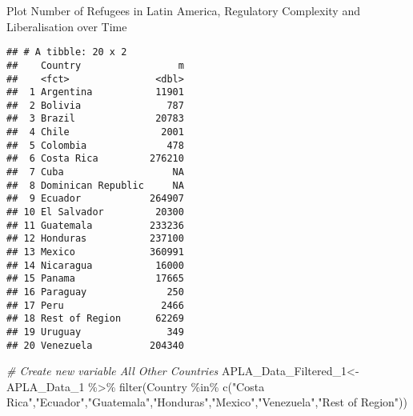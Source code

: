 \documentclass[
  ignorenonframetext,
]{beamer}
\newenvironment{Shaded}{\begin{snugshade}}{\end{snugshade}}
\newcommand{\AttributeTok}[1]{\textcolor[rgb]{0.77,0.63,0.00}{#1}}
\newcommand{\CommentTok}[1]{\textcolor[rgb]{0.56,0.35,0.01}{\textit{#1}}}
\newcommand{\FunctionTok}[1]{\textcolor[rgb]{0.00,0.00,0.00}{#1}}
\newcommand{\NormalTok}[1]{#1}
\newcommand{\OtherTok}[1]{\textcolor[rgb]{0.56,0.35,0.01}{#1}}
\newcommand{\SpecialCharTok}[1]{\textcolor[rgb]{0.00,0.00,0.00}{#1}}
\newcommand{\StringTok}[1]{\textcolor[rgb]{0.31,0.60,0.02}{#1}}
\begin{document}
\begin{frame}[fragile]{Plot Number of Refugees in Latin America,
Regulatory Complexity and Liberalisation over Time}
\protect\hypertarget{plot-number-of-refugees-in-latin-america-regulatory-complexity-and-liberalisation-over-time}{}
\begin{Shaded}
\end{Shaded}

\begin{verbatim}
## # A tibble: 20 x 2
##    Country                 m
##    <fct>               <dbl>
##  1 Argentina           11901
##  2 Bolivia               787
##  3 Brazil              20783
##  4 Chile                2001
##  5 Colombia              478
##  6 Costa Rica         276210
##  7 Cuba                   NA
##  8 Dominican Republic     NA
##  9 Ecuador            264907
## 10 El Salvador         20300
## 11 Guatemala          233236
## 12 Honduras           237100
## 13 Mexico             360991
## 14 Nicaragua           16000
## 15 Panama              17665
## 16 Paraguay              250
## 17 Peru                 2466
## 18 Rest of Region      62269
## 19 Uruguay               349
## 20 Venezuela          204340
\end{verbatim}

\begin{Shaded}
\begin{Highlighting}[]
\CommentTok{\# Create new variable All Other Countries}
\NormalTok{APLA\_Data\_Filtered\_1}\OtherTok{\textless{}{-}}\NormalTok{ APLA\_Data\_1 }\SpecialCharTok{\%\textgreater{}\%}
    \FunctionTok{filter}\NormalTok{(Country }\SpecialCharTok{\%in\%} \FunctionTok{c}\NormalTok{(}\StringTok{"Costa Rica"}\NormalTok{,}\StringTok{"Ecuador"}\NormalTok{,}\StringTok{"Guatemala"}\NormalTok{,}\StringTok{"Honduras"}\NormalTok{,}\StringTok{"Mexico"}\NormalTok{,}\StringTok{"Venezuela"}\NormalTok{,}\StringTok{"Rest of Region"}\NormalTok{))}


\end{Highlighting}
\end{Shaded}
\end{frame}
\end{document}
